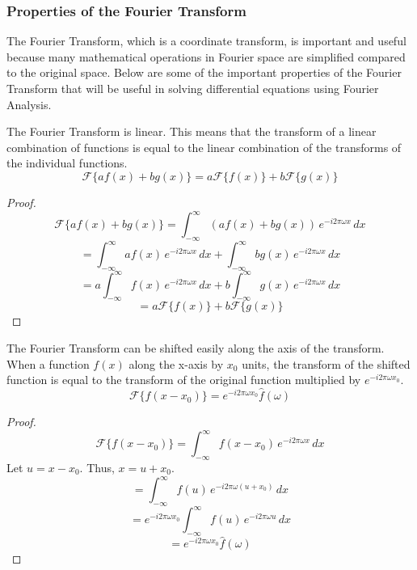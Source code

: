 \subsubsection{Properties of the Fourier Transform}
The Fourier Transform, which is a coordinate transform, is important and useful because many mathematical operations in Fourier space are simplified compared to the original space. Below are some of the important properties of the Fourier Transform that will be useful in solving differential equations using Fourier Analysis.
\begin{lemma}
    The Fourier Transform is linear. This means that the transform of a linear combination of functions is equal to the linear combination of the transforms of the individual functions.
    \[ \mathcal{F}\{ a f(x) + b g(x) \} = a \mathcal{F}\{ f(x) \} + b \mathcal{F}\{ g(x) \} \]
\end{lemma}
\begin{proof}
    \[ \mathcal{F}\{ a f(x) + b g(x) \} = \int_{-\infty}^{\infty} (a f(x) + b g(x)) \, e^{-i 2\pi \omega x} \,dx \]
    \[ = \int_{-\infty}^{\infty} a f(x) \, e^{-i 2\pi \omega x} \,dx + \int_{-\infty}^{\infty} b g(x) \, e^{-i 2\pi \omega x} \,dx \]
    \[ = a \int_{-\infty}^{\infty} f(x) \, e^{-i 2\pi \omega x} \,dx + b \int_{-\infty}^{\infty} g(x) \, e^{-i 2\pi \omega x} \,dx \]
    \[ = a \mathcal{F}\{ f(x) \} + b \mathcal{F}\{ g(x) \} \]
\end{proof}


\begin{lemma}
    The Fourier Transform can be shifted easily along the axis of the transform. When a function \(f(x)\) along the x-axis by \(x_0\) units, the transform of the shifted function is equal to the transform of the original function multiplied by $e^{-i 2\pi \omega x_0}$.
    \[ \mathcal{F}\{ f(x - x_0) \} = e^{-i 2\pi \omega x_0} \hat{f}(\omega) \]
\end{lemma}

\begin{proof}
    \[ \mathcal{F}\{ f(x - x_0) \} = \int_{-\infty}^{\infty} f(x - x_0) \, e^{-i 2\pi \omega x} \,dx \]
    Let \(u = x - x_0\). Thus, \(x = u + x_0\).
    \[ = \int_{-\infty}^{\infty} f(u) \, e^{-i 2\pi \omega (u + x_0)} \,dx \]
    \[ = e^{-i 2\pi \omega x_0} \int_{-\infty}^{\infty} f(u) \, e^{-i 2\pi \omega u} \,dx \]
    \[ = e^{-i 2\pi \omega x_0} \hat{f}(\omega) \]
\end{proof}

